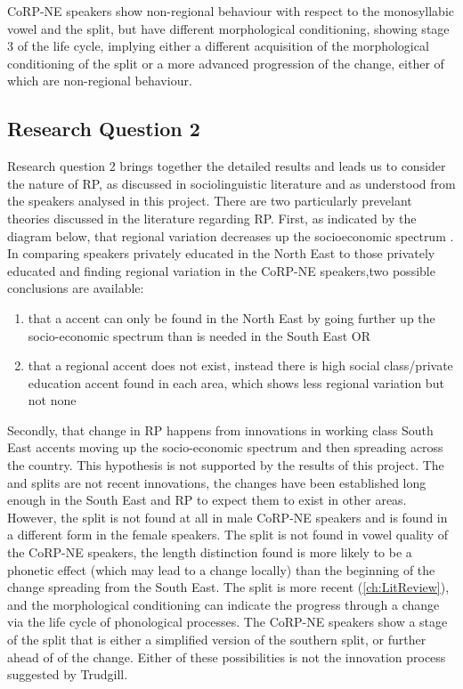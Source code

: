 \documentclass[../../00.FullDoc/tex/ThesisSkeleton-draft2]{subfiles}
\begin{document}
CoRP-NE speakers show non-regional behaviour with respect to the monosyllabic \goat{} vowel and the \GG{} split, but have different morphological conditioning, showing stage 3 of the life cycle, implying either a different acquisition of the morphological conditioning of the split or a more advanced progression of the change, either of which are non-regional behaviour.

\subsection{Research Question 2} \label{sec:disc:RQ2}
Research question 2 brings together the detailed results and leads us to consider the nature of RP, as discussed in sociolinguistic literature and as understood from the speakers analysed in this project. 
There are two particularly prevelant theories discussed in the literature regarding RP. First, as indicated by the diagram below, that regional variation decreases up the socioeconomic spectrum . In comparing speakers privately educated in the North East to those privately educated and finding regional variation in the CoRP-NE speakers,two possible conclusions are available:
\begin{enumerate}
	\item that a  accent can only be found in the North East by going further up the socio-economic spectrum than is needed in the South East
	\newline OR
	\item that a regional accent does not exist, instead there is high social class/private education accent found in each area, which shows less regional variation but not none
\end{enumerate}

Secondly, that change in RP happens from innovations in working class South East accents moving up the socio-economic spectrum and then spreading across the country. This hypothesis is not supported by the results of this project. The \FS{} and \TB{} splits are not recent innovations, the changes have been established long enough in the South East and RP to expect them to exist in other areas. However, the \FS{} split is not found at all in male CoRP-NE speakers and is found in a different form in the female speakers. The \TB{} split is not found in vowel quality of the CoRP-NE speakers, the length distinction found is more likely to be a phonetic effect (which may lead to a change locally) than the beginning of the change spreading from the South East. The \GG{} split is more recent (\ref{ch:LitReview}), and the morphological conditioning can indicate the progress through a change via the life cycle of phonological processes. The CoRP-NE speakers show a stage of the split that is either a simplified version of the southern split, or further ahead of of the change. Either of these possibilities is not the innovation process suggested by Trudgill.
\end{document}
